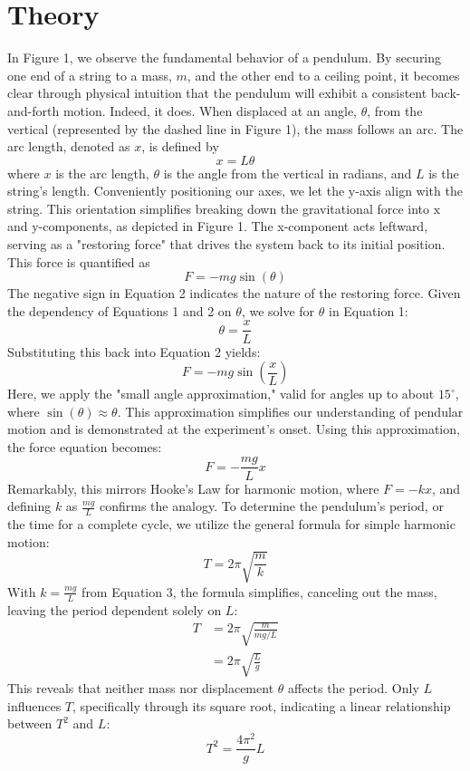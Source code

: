 \documentclass{report}
\begin{document}
    \section{Theory}
    \bigbreak \noindent 
    \begin{figure}[ht]
        \centering
        \label{fig:fc1}
    \end{figure}
    \bigbreak \noindent 
    In Figure 1, we observe the fundamental behavior of a pendulum. By securing one end of a string to a mass, $m$, and the other end to a ceiling point, it becomes clear through physical intuition that the pendulum will exhibit a consistent back-and-forth motion. Indeed, it does. When displaced at an angle, $\theta$, from the vertical (represented by the dashed line in Figure 1), the mass follows an arc. The arc length, denoted as $x$, is defined by
    $$
    x = L \theta
    $$
    \bigbreak \noindent 
    where $x$ is the arc length, $\theta$ is the angle from the vertical in radians, and $L$ is the string's length. Conveniently positioning our axes, we let the $\mathrm{y}$-axis align with the string. This orientation simplifies breaking down the gravitational force into $\mathrm{x}$ and y-components, as depicted in Figure 1. The x-component acts leftward, serving as a "restoring force" that drives the system back to its initial position. This force is quantified as
    $$
    F = -m g \sin(\theta)
    $$
    \bigbreak \noindent 
    The negative sign in Equation 2 indicates the nature of the restoring force. Given the dependency of Equations 1 and 2 on $\theta$, we solve for $\theta$ in Equation 1:
    $$
    \theta = \frac{x}{L}
    $$
    \bigbreak \noindent 
    Substituting this back into Equation 2 yields:
    $$
    F = -m g \sin\left(\frac{x}{L}\right)
    $$
    \bigbreak \noindent 
    Here, we apply the "small angle approximation," valid for angles up to about $15^{\circ}$, where $\sin(\theta) \approx \theta$. This approximation simplifies our understanding of pendular motion and is demonstrated at the experiment's onset. Using this approximation, the force equation becomes:
    $$
    F = -\frac{m g}{L} x
    $$
    \bigbreak \noindent 
    Remarkably, this mirrors Hooke's Law for harmonic motion, where $F = -k x$, and defining $k$ as $\frac{m g}{L}$ confirms the analogy. To determine the pendulum's period, or the time for a complete cycle, we utilize the general formula for simple harmonic motion:
    $$
    T = 2\pi \sqrt{\frac{m}{k}}
    $$
    \bigbreak \noindent 
    With $k = \frac{m g}{L}$ from Equation 3, the formula simplifies, canceling out the mass, leaving the period dependent solely on $L$:
    $$
    \begin{aligned}
        T &= 2\pi \sqrt{\frac{m}{m g / L}} \\
          &= 2\pi \sqrt{\frac{L}{g}}
    \end{aligned}
    $$
    \bigbreak \noindent 
    This reveals that neither mass nor displacement $\theta$ affects the period. Only $L$ influences $T$, specifically through its square root, indicating a linear relationship between $T^2$ and $L$:
    $$
    T^2 = \frac{4 \pi^2}{g} L
    $$
    \bigbreak \noindent 
\end{document}
